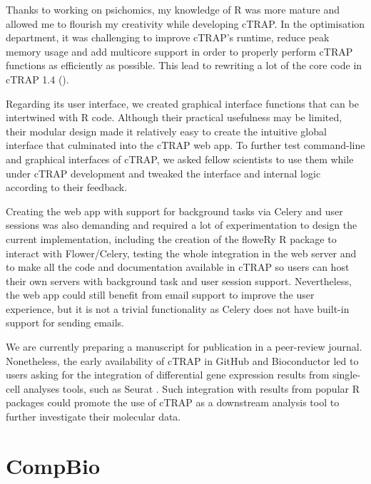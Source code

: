 Thanks to working on psichomics, my knowledge of R was more mature and allowed me to flourish my creativity while developing cTRAP. In the optimisation department, it was challenging to improve cTRAP's runtime, reduce peak memory usage and add multicore support in order to properly perform cTRAP functions as efficiently as possible. This lead to rewriting a lot of the core code in cTRAP 1.4 ().

Regarding its user interface, we created graphical interface functions that can be intertwined with R code. Although their practical usefulness may be limited, their modular design made it relatively easy to create the intuitive global interface that culminated into the cTRAP web app. To further test command-line and graphical interfaces of cTRAP, we asked fellow scientists to use them while under cTRAP development and tweaked the interface and internal logic according to their feedback. %

Creating the web app with support for background tasks via Celery and user sessions was also demanding and required a lot of experimentation to design the current implementation, including the creation of the floweRy R package to interact with Flower/Celery, testing the whole integration in the web server and to make all the code and documentation available in cTRAP so users can host their own servers with background task and user session support. Nevertheless, the web app could still benefit from email support to improve the user experience, but it is not a trivial functionality as Celery does not have built-in support for sending emails.

We are currently preparing a manuscript for publication in a peer-review journal. Nonetheless, the early availability of cTRAP in GitHub and Bioconductor led to users asking for the integration of differential gene expression results from single-cell analyses tools, such as Seurat \cite{hao:2021aa}. Such integration with results from popular R packages could promote the use of cTRAP as a downstream analysis tool to further investigate their molecular data.

\section{CompBio}


